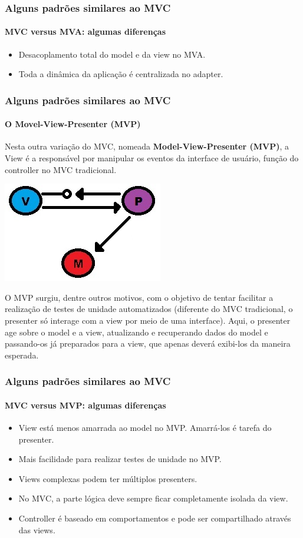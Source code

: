 \documentclass{beamer}
\begin{document}
\begin{frame}
\frametitle{Alguns padrões similares ao MVC}
\framesubtitle{MVC versus MVA: algumas diferenças}
\begin{itemize}
	\item Desacoplamento total do model e da view no MVA.
	\item Toda a dinâmica da aplicação é centralizada no adapter.
\end{itemize}
\end{frame}

\begin{frame}
\frametitle{Alguns padrões similares ao MVC}
\framesubtitle{O Movel-View-Presenter (MVP)}
	Nesta outra variação do MVC, nomeada \textbf{Model-View-Presenter (MVP)}, a View é a responsável por manipular os eventos da interface de usuário, função do controller no MVC tradicional.
	\begin{center}
		\includegraphics[scale=0.3]{MVP.jpg}
	\end{center}
	O MVP surgiu, dentre outros motivos, com o objetivo de tentar facilitar a realização de testes de unidade automatizados (diferente do MVC tradicional, o presenter
	só interage com a view por meio de uma interface). Aqui, o presenter age sobre o model e a view, atualizando e recuperando dados do model e passando-os já preparados para a view, que apenas deverá exibi-los da maneira esperada.
\end{frame}

\begin{frame}
\frametitle{Alguns padrões similares ao MVC}
\framesubtitle{MVC versus MVP: algumas diferenças}
\begin{itemize}
	\item View está menos amarrada ao model no MVP. Amarrá-los é tarefa do presenter.\\
	\item Mais facilidade para realizar testes de unidade no MVP.\\
	\item Views complexas podem ter múltiplos presenters.
	\item No MVC, a parte lógica deve sempre ficar completamente isolada da view.
	\item Controller é baseado em comportamentos e pode ser compartilhado através das views.
\end{itemize}
\end{frame}
\end{document}
